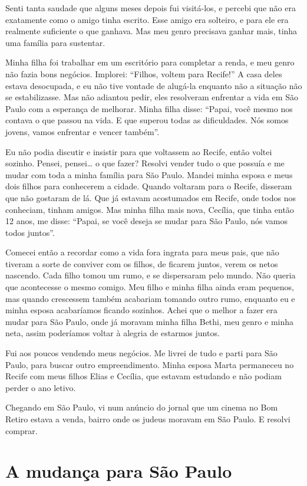 Senti tanta saudade que alguns meses depois fui visitá-los, e
percebi que não era exatamente como o amigo tinha escrito. Esse amigo era solteiro, e para ele  era realmente suficiente o que ganhava. Mas meu genro precisava ganhar mais, tinha uma família para sustentar.

Minha filha foi trabalhar em um escritório para completar a renda, e 
meu genro não fazia bons negócios. Implorei: ``Filhos, voltem para
Recife!'' A casa deles estava desocupada, e eu não tive vontade de
alugá-la enquanto não a situação não se estabilizasse. Mas não adiantou pedir, eles resolveram enfrentar a vida em São
Paulo com a esperança de melhorar. Minha filha disse:
``Papai, você mesmo nos contava o que passou na vida. E que superou
todas as dificuldades. Nós somos jovens, vamos enfrentar e
vencer também''.

Eu não podia discutir e insistir para que voltassem ao Recife, então 
voltei sozinho. Pensei, pensei\ldots{} o que fazer? Resolvi vender tudo o que
possuía e me mudar com toda a minha família para São Paulo. Mandei minha
esposa e meus dois filhos para conhecerem a cidade. Quando 
voltaram para o Recife, disseram que não gostaram de lá. 
Que já estavam acostumados em Recife, onde todos nos conheciam,
tinham amigos. Mas minha filha mais nova, Cecília, que tinha então 12 
anos, me disse: ``Papai, se você deseja se mudar para São Paulo, nós
vamos todos juntos''.

Comecei então a recordar como a vida fora ingrata para meus pais, que não
tiveram a sorte de conviver com os filhos, de ficarem juntos, verem os
netos nascendo. Cada filho tomou um rumo, e se dispersaram
pelo mundo. Não queria que acontecesse o mesmo comigo. Meu filho e
minha filha ainda eram pequenos, mas quando crescessem também
acabariam tomando outro rumo, enquanto eu e minha esposa acabaríamos ficando sozinhos.
Achei que o melhor a fazer era mudar para São Paulo, onde já
moravam minha filha Bethi, meu genro e minha neta, assim poderíamos voltar à alegria de estarmos juntos.

Fui aos poucos vendendo meus negócios. Me livrei de tudo e parti para São
Paulo, para buscar outro empreendimento. Minha esposa Marta
permaneceu no Recife com meus filhos Elias e Cecília, que estavam
estudando e não podiam perder o ano letivo.

Chegando em São Paulo, vi num anúncio do jornal que um cinema no Bom 
Retiro estava a venda, bairro onde os judeus moravam em São Paulo. E 
resolvi comprar.

\chapter{A mudança para São Paulo}

